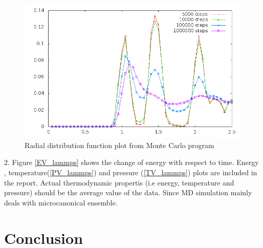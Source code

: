 \documentclass{article}
\begin{document}
\begin{doublespacing}
\begin{figure}[H]
\begin{center}
\includegraphics[scale=0.8]{RDF_MC} 
\caption{Radial distribution function plot from Monte Carlo program}
\label{RDF_MC}
\end{center}
\end{figure}

2. Figure \ref{EV_lammps} shows the change of energy with respect to time. Energy , temperature(\ref{PV_lammps}) and pressure (\ref{TV_lammps}) plots are included in the report. Actual thermodynamic propertis (i.e energy, temperature and pressure) should be the average value of the data. Since MD simulation mainly deals with microcanonical ensemble.

\section{Conclusion}


\end{doublespacing}



\newpage

\end{document}
